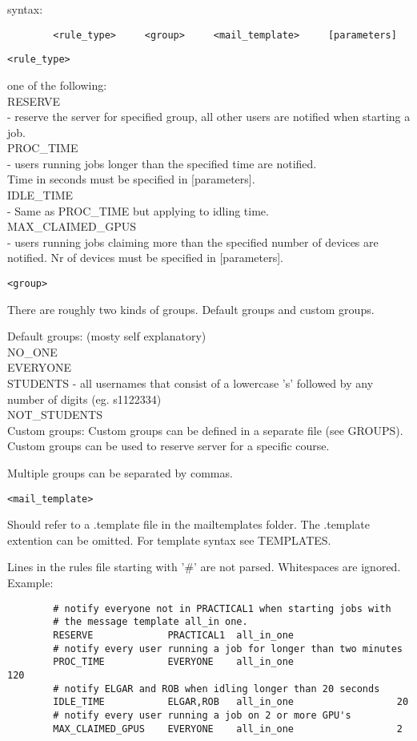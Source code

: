 \documentclass[10pt]{article}
\begin{document}
syntax:
\begin{verbatim}
        <rule_type>     <group>     <mail_template>     [parameters]
\end{verbatim}
\begin{verbatim}<rule_type>\end{verbatim}one of the following:\\
RESERVE\\
- reserve the server for specified group, all other users
are notified when starting a job.\\
PROC\_TIME\\
- users running jobs longer than the specified time are 
notified. \\Time in seconds must be specified in [parameters].\\
IDLE\_TIME\\
- Same as PROC\_TIME but applying to idling time.\\
MAX\_CLAIMED\_GPUS\\
- users running jobs claiming more than the specified number 
of devices are notified. Nr of devices must be specified 
in [parameters].

\begin{verbatim}<group>\end{verbatim}
There are roughly two kinds of groups. Default groups and 
custom groups. 

Default groups: (mosty self explanatory)\\
NO\_ONE\\
EVERYONE\\
STUDENTS
- all usernames that consist of a lowercase 's' followed 
by any number of digits (eg. s1122334)\\
NOT\_STUDENTS\\

Custom groups:
Custom groups can be defined in a separate file (see GROUPS). Custom 
groups can be used to reserve server for a specific course.

Multiple groups can be separated by commas.


\begin{verbatim}<mail_template>\end{verbatim}
Should refer to a .template file in the mailtemplates folder.
The .template extention can be omitted. For template syntax
see TEMPLATES.


Lines in the rules file starting with '\#' are not parsed.
Whitespaces are ignored.
Example:
\begin{verbatim}
        # notify everyone not in PRACTICAL1 when starting jobs with 
        # the message template all_in one.
        RESERVE             PRACTICAL1  all_in_one
        # notify every user running a job for longer than two minutes
        PROC_TIME           EVERYONE    all_in_one                  120
        # notify ELGAR and ROB when idling longer than 20 seconds
        IDLE_TIME           ELGAR,ROB   all_in_one                  20
        # notify every user running a job on 2 or more GPU's
        MAX_CLAIMED_GPUS    EVERYONE    all_in_one                  2
\end{verbatim}
        
\end{document}
